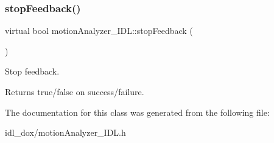 \subsubsection{\texorpdfstring{stopFeedback()}{stopFeedback()}}
{\footnotesize\ttfamily virtual bool motion\+Analyzer\+\_\+\+I\+D\+L\+::stop\+Feedback (\begin{DoxyParamCaption}{ }\end{DoxyParamCaption})\hspace{0.3cm}{\ttfamily [virtual]}}



Stop feedback. 

\begin{DoxyReturn}{Returns}
true/false on success/failure. 
\end{DoxyReturn}


The documentation for this class was generated from the following file\+:\begin{DoxyCompactItemize}
\item 
idl\+\_\+dox/motion\+Analyzer\+\_\+\+I\+D\+L.\+h\end{DoxyCompactItemize}

